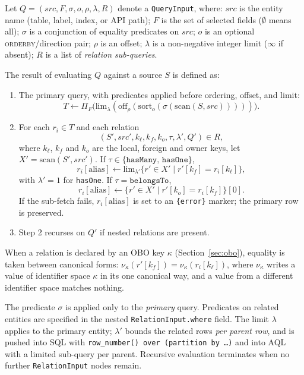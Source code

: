 \documentclass[sigconf,nonacm]{acmart}
\begin{document}
Let $Q = (\mathit{src}, F, \sigma, o, \rho, \lambda, R)$
denote a \texttt{QueryInput}, where:
$\mathit{src}$ is the entity name (table, label, index, or API path);
$F$ is the set of selected fields ($\emptyset$ means all);
$\sigma$ is a conjunction of equality predicates on $\mathit{src}$;
$o$ is an optional \textsc{orderby}/direction pair;
$\rho$ is an offset;
$\lambda$ is a non-negative integer limit ($\infty$ if absent);
$R$ is a list of \emph{relation sub-queries}.

The result of evaluating $Q$ against a source $S$ is defined as:

\begin{enumerate}
  \item The primary query, with predicates applied before ordering,
        offset, and limit:
        \[ T \leftarrow \Pi_F\bigl(\mathrm{lim}_\lambda(\mathrm{off}_\rho(\mathrm{sort}_o(\sigma(\text{scan}(S, \mathit{src})))))\bigr). \]
  \item For each $r_i \in T$ and each relation
        \[ (S', \mathit{src'}, k_\ell, k_f, k_o, \tau, \lambda', Q') \in R, \]
        where $k_\ell$, $k_f$ and $k_o$ are the local, foreign and
        owner keys, let $X' = \text{scan}(S', \mathit{src'})$.
        If $\tau \in \{\texttt{hasMany},\,\texttt{hasOne}\}$,
        \[ r_i[\text{alias}] \leftarrow \mathrm{lim}_{\lambda'}\{r' \in X' \mid r'[k_f] = r_i[k_\ell]\}, \]
        with $\lambda' = 1$ for \texttt{hasOne}.
        If $\tau = \texttt{belongsTo}$,
        \[ r_i[\text{alias}] \leftarrow \{r' \in X' \mid r'[k_o] = r_i[k_f]\}[0]. \]
        If the sub-fetch fails, $r_i[\text{alias}]$ is set to an
        \texttt{\{error\}} marker; the primary row is preserved.
  \item Step 2 recurses on $Q'$ if nested relations are present.
\end{enumerate}

When a relation is declared by an OBO key $\kappa$
(Section~\ref{sec:obo}), equality is taken between canonical forms:
$\nu_\kappa(r'[k_f]) = \nu_\kappa(r_i[k_\ell])$, where $\nu_\kappa$
writes a value of identifier space $\kappa$ in its one canonical way,
and a value from a different identifier space matches nothing.

The predicate $\sigma$ is applied only to the \emph{primary} query.
Predicates on related entities are specified in the nested
\texttt{RelationInput.where} field.  The limit $\lambda$ applies to the
primary entity; $\lambda'$ bounds the related rows \emph{per parent
row}, and is pushed into SQL with
\texttt{row\_number() over (partition by \ldots)} and into AQL with a
limited sub-query per parent.  Recursive evaluation terminates when no
further \texttt{RelationInput} nodes remain.
\end{document}
